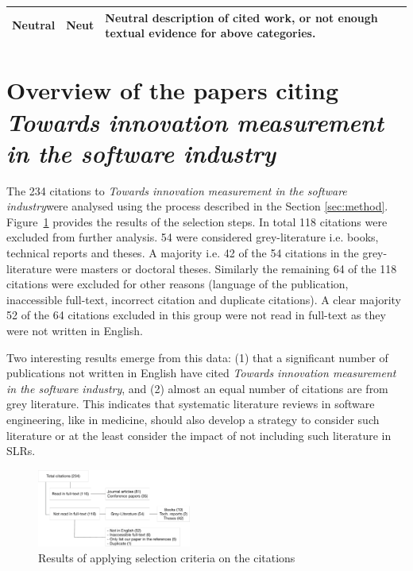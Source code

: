 \documentclass[sigplan]{acmart}
\newcommand{\theArticle}{\textit{Towards innovation measurement in the software industry}}
\begin{document}
\begin{table}
\begin{tabular}{llp{12cm}}
		\midrule
		Neutral             & Neut         & Neutral description of cited work, or not enough textual evidence for above categories.\\
		\bottomrule
	\end{tabular}
\end{table}

\section{Overview of the papers citing \theArticle}\label{sec:whocites}  %

The 234 citations to \theArticle were analysed using the process described in the Section \ref{sec:method}. Figure~\ref{fig:selection} provides the results of the selection steps. In total 118 citations were excluded from further analysis. 54 were considered grey-literature i.e. books, technical reports and theses. A majority i.e. 42 of the 54 citations in the grey-literature were masters or doctoral theses. Similarly the remaining 64 of the 118 citations were excluded for other reasons (language of the publication, inaccessible full-text, incorrect citation and duplicate citations). A clear majority 52 of the 64 citations excluded in this group were not read in full-text as they were not written in English.

Two interesting results emerge from this data: (1) that a significant number of publications not written in English have cited \theArticle, and (2) almost an equal number of citations are from grey literature. This indicates that systematic literature reviews in software engineering, like in medicine, should also develop a strategy to consider such literature or at the least consider the impact of not including such literature in SLRs.

\begin{figure}[htbp]
	\begin{center}
		\includegraphics[width=0.45\textwidth,height=\textheight,keepaspectratio]{Figures/Citations.pdf}
	\end{center}
	\caption{Results of applying selection criteria on the citations}
	\label{fig:selection}
\end{figure}
\end{document}
